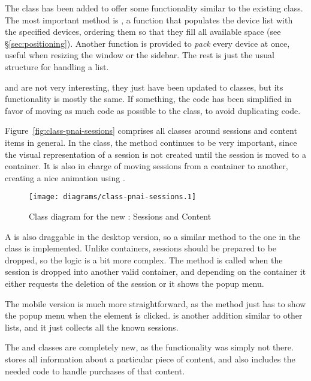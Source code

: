 The  class has been added to offer some functionality similar to the existing  class.
The most important method is , a function that populates the device list with the specified devices, ordering them so that they fill all available space (see \S\vref{sec:positioning}).
Another function is provided to \emph{pack} every device at once, useful when resizing the window or the sidebar.
The rest is just the usual structure for handling a list.

 and  are not very interesting, they just have been updated to  classes, but its functionality is mostly the same.
If something, the code has been simplified in favor of moving as much code as possible to the  class, to avoid duplicating code.

Figure~\vref{fig:class-pnai-sessions} comprises all classes around sessions and content items in general.
In the  class, the  method continues to be very important, since the visual representation of a session is not created until the session is moved to a container.
It is also in charge of moving sessions from a container to another, creating a nice animation using .

\begin{figure}[htbp]
  \centering
    \texttt{[image: diagrams/class-pnai-sessions.1]}
  \caption{Class diagram for the new : Sessions and Content}
  \label{fig:class-pnai-sessions}
\end{figure}

A  is also draggable in the desktop version, so a similar method to the one in the  class is implemented.
Unlike containers, sessions should be prepared to be dropped, so the logic is a bit more complex.
The  method is called when the session is dropped into another valid container, and depending on the container it either requests the deletion of the session or it shows the popup menu.

The mobile version is much more straightforward, as the  method just has to show the popup menu when the element is clicked.
 is another addition similar to other lists, and it just collects all the known sessions.

The  and  classes are completely new, as the functionality was simply not there.
 stores all information about a particular piece of content, and also includes the needed code to handle purchases of that content.

